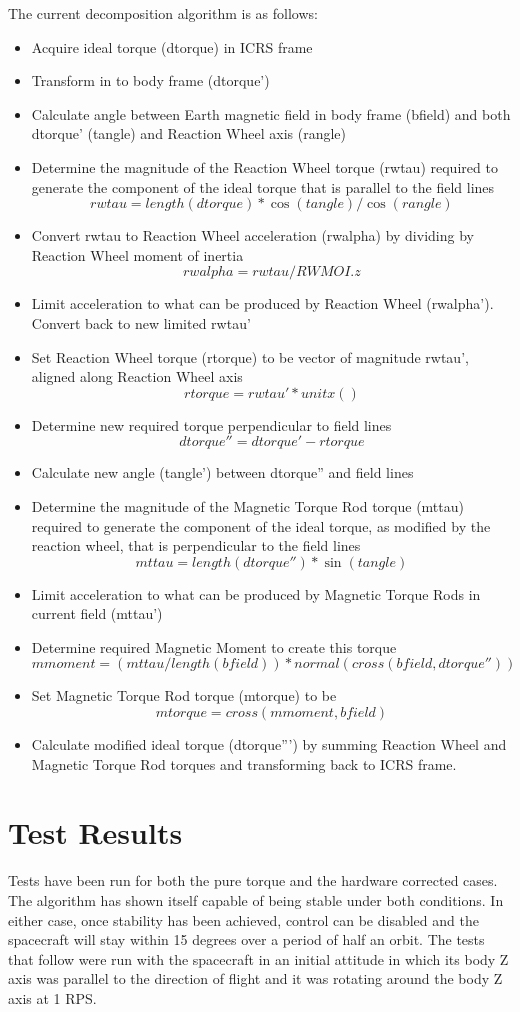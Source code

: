 \documentclass[12pt,letterpaper]{report}
\begin{document}
The current decomposition algorithm is as follows:

\begin{itemize}
\item Acquire ideal torque (dtorque) in ICRS frame
\item Transform in to body frame (dtorque')
\item Calculate angle between Earth magnetic field in body frame (bfield) and both dtorque' (tangle) and Reaction Wheel axis (rangle)
\item Determine the magnitude of the Reaction Wheel torque (rwtau) required to generate the component of the ideal torque that is parallel to the field lines \[rwtau = length(dtorque) * \cos(tangle) / \cos(rangle)\]
\item Convert rwtau to Reaction Wheel acceleration (rwalpha) by dividing by Reaction Wheel moment of inertia \[rwalpha = rwtau / RWMOI.z\]
\item Limit acceleration to what can be produced by Reaction Wheel (rwalpha'). Convert back to new limited rwtau'
\item Set Reaction Wheel torque (rtorque) to be vector of magnitude rwtau', aligned along Reaction Wheel axis \[rtorque = rwtau' * unitx()\]
\item Determine new required torque perpendicular to field lines \[dtorque'' = dtorque' - rtorque\]
\item Calculate new angle (tangle') between dtorque'' and field lines
\item Determine the magnitude of the Magnetic Torque Rod torque (mttau) required to generate the component of the ideal torque, as modified by the reaction wheel, that is perpendicular to the field lines \[mttau = length(dtorque'') * \sin(tangle)\]
\item Limit acceleration to what can be produced by Magnetic Torque Rods in current field (mttau')
\item Determine required Magnetic Moment to create this torque \[mmoment = (mttau/length(bfield)) * normal(cross(bfield,dtorque''))\]
\item Set Magnetic Torque Rod torque (mtorque) to be \[mtorque = cross(mmoment,bfield)\]
\item Calculate modified ideal torque (dtorque''') by summing Reaction Wheel and Magnetic Torque Rod torques and transforming back to ICRS frame.
\end{itemize}

\section{Test Results}
Tests have been run for both the pure torque and the hardware corrected cases. The algorithm has shown itself capable of being stable under both conditions. In either case, once stability has been achieved, control can be disabled and the spacecraft will stay within 15 degrees over a period of half an orbit. The tests that follow were run with the spacecraft in an initial attitude in which its body Z axis was parallel to the direction of flight and it was rotating around the body Z axis at 1 RPS.
\\
\end{document}
